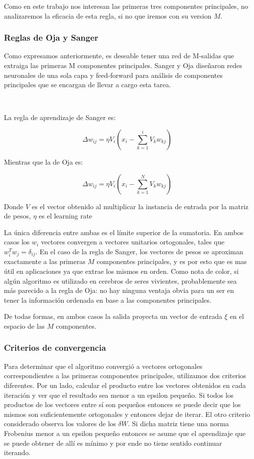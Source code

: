 \documentclass[informe.tex]{subfiles}
\begin{document}
	Como en este trabajo nos interesan las primeras tres componentes principales, no analizaremos la eficacia de esta regla, si no que iremos con su version $M$.
      
      \subsubsection{Reglas de Oja y Sanger}
	Como expresamos anteriormente, es deseable tener una red de M-salidas que extraiga las primeras M componentes principales. Sanger y Oja diseñaron redes neuronales de una sola capa y feed-forward para análisis de componentes principales que se encargan de llevar a cargo esta tarea.
	
	~
	
	La regla de aprendizaje de Sanger es:

	$$\Delta w_{ij} = \eta V_i(x_i - \sum_{k=1}^{i} V_k w_{kj} )$$

	Mientras que la de Oja es:

	$$\Delta w_{ij} = \eta V_i(x_i - \sum_{k=1}^{N} V_k w_{kj} )$$
	
	Donde $V$ es el vector obtenido al multiplicar la instancia de entrada por la matriz de pesos, $\eta$ es el learning rate 

	La única diferencia entre ambas es el límite superior de la sumatoria. En ambos casos los $w_i$ vectores convergen a vectores unitarios ortogonales, tales que $w^{T}_i w_j = \delta_{ij}$. En el caso de la regla de Sanger, los vectores de pesos se aproximan exactamente a las primeras $M$ componentes principales, y es por esto que es mas \'util en aplicaciones ya que extrae los mismos en orden. Como nota de color, si algún algoritmo es utilizado en cerebros de seres vivientes, probablemente sea más parecido a la regla de Oja: no hay ninguna ventaja obvia para un ser en tener la información ordenada en base a las componentes principales. 

	De todas formas, en ambos casos la salida proyecta un vector de entrada $\xi$ en el espacio de las $M$ componentes.
	
      \subsubsection{Criterios de convergencia}
	Para determinar que el algoritmo convergió a vectores ortogonales correspondientes a las primeras componentes principales, utilizamos dos criterios diferentes. Por un lado, calcular el producto entre los vectores obtenidos en cada iteración y ver que el resultado sea menor a un epsilon pequeño. Si todos los productos de los vectores entre sí son pequeños entonces se puede decir que los mismos son suficientemente ortogonales y entonces dejar de iterar. El otro criterio considerado observa los valores de los $\delta W$. Si dicha matriz tiene una norma Frobenius menor a un epsilon pequeño entonces se asume que el aprendizaje que se puede obtener de allí es mínimo y por ende no tiene sentido continuar iterando.
	
\end{document}
